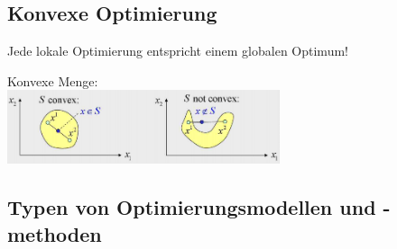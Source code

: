 
\subsection{Konvexe Optimierung }
  Jede lokale Optimierung entspricht einem globalen Optimum!
  
  Konvexe Menge:\\
  \includegraphics[width=8cm]{./Content/OptMathModels/ConvexSet}

\subsection{Typen von Optimierungsmodellen und -methoden }

